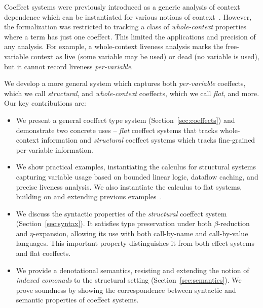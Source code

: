 Coeffect systems were previously introduced as a generic analysis of
context dependence which can be instantiated for various notions of
context~\cite{petricek2013coeffects}. However, the formalization was restricted to
tracking a class of \emph{whole-context} properties where a term has just
one coeffect. This limited the applications and precision of any
analysis. For example, a whole-context liveness analysis marks the 
free-variable context as live (some variable may be used) or dead 
(no variable is used), but it cannot record liveness \emph{per-variable}. 

We develop a more general system which captures both
\emph{per-variable} coeffects, which we call \emph{structural}, and
\emph{whole-context} coeffects, which we call \emph{flat}, and more. Our
key contributions are:

\begin{itemize}
\item We present a general coeffect type system (Section~\ref{sec:coeffects}) and demonstrate two 
  concrete uses -- \emph{flat} coeffect systems that tracks whole-context information and 
  \emph{structural} coeffect systems which tracks fine-grained per-variable information. 

\item We show practical examples, instantiating the calculus for structural systems capturing 
  variable usage based on bounded linear logic, dataflow caching, and precise liveness analysis.
  We also instantiate the calculus to flat systems, building on and extending previous examples~\cite{petricek2013coeffects}.

\item We discuss the syntactic properties of the \emph{structural} coeffect system 
  (Section~\ref{sec:syntax}). It satisfies type preservation under both $\beta$-reduction 
  and $\eta$-expansion, allowing its use with both call-by-name and call-by-value languages.
  This important property distinguishes it from both effect systems and flat coeffects.

\item We provide a denotational semantics, resisting and extending the notion of \emph{indexed comonads} to the 
structural setting (Section~\ref{sec:semantics}). We prove soundness by showing 
  the correspondence between syntactic and semantic properties of coeffect systems.
\end{itemize}

